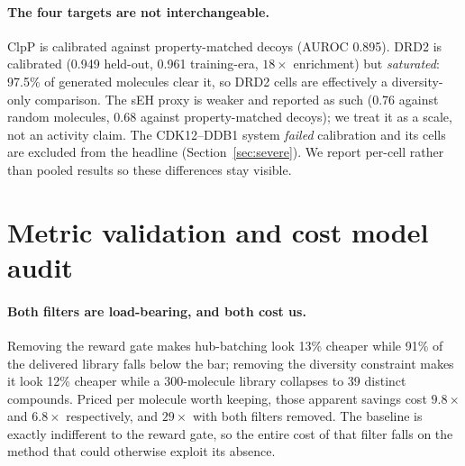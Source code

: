 \documentclass{article}
\newcommand{\checkval}[1]{#1}
\begin{document}
\paragraph{The four targets are not interchangeable.} ClpP is calibrated against property-matched decoys (AUROC \checkval{0.895}). DRD2 is calibrated (\checkval{0.949} held-out, \checkval{0.961} training-era, \checkval{$18\times$} enrichment) but \emph{saturated}: \checkval{97.5\%} of generated molecules clear it, so DRD2 cells are effectively a diversity-only comparison. The sEH proxy is weaker and reported as such (\checkval{0.76} against random molecules, \checkval{0.68} against property-matched decoys); we treat it as a scale, not an activity claim. The CDK12--DDB1 system \emph{failed} calibration and its cells are excluded from the headline (Section~\ref{sec:severe}). We report per-cell rather than pooled results so these differences stay visible.



\section{Metric validation and cost model audit}
\label{app:fair}
\paragraph{Both filters are load-bearing, and both cost us.}
Removing the reward gate makes hub-batching look \checkval{13\%} cheaper while \checkval{91\%} of the delivered library falls below the bar; removing the diversity constraint makes it look \checkval{12\%} cheaper while a 300-molecule library collapses to \checkval{39} distinct compounds. Priced per molecule worth keeping, those apparent savings cost \checkval{$9.8\times$} and \checkval{$6.8\times$} respectively, and \checkval{$29\times$} with both filters removed. The baseline is exactly indifferent to the reward gate, so the entire cost of that filter falls on the method that could otherwise exploit its absence.
\end{document}
